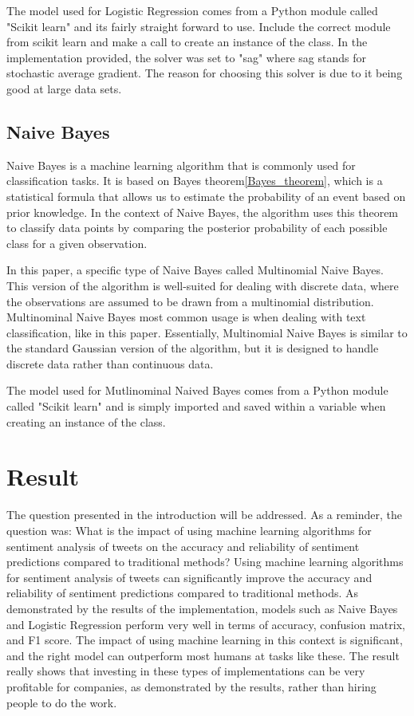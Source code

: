 \documentclass[conference]{IEEEtran}
\begin{document}
The model used for Logistic Regression comes from a Python module called "Scikit learn" and its fairly straight forward to use. Include the correct module from scikit learn and make a call to create an instance of the class. In the implementation provided, the solver was set to "sag"  where sag stands for stochastic average gradient. The reason for choosing this solver is due to it being good at large data sets. \cite{solvers}


\subsection{Naive Bayes}
Naive Bayes is a machine learning algorithm that is commonly used for classification tasks. It is based on Bayes theorem\eqref{Bayes_theorem}, which is a statistical formula that allows us to estimate the probability of an event based on prior knowledge. In the context of Naive Bayes, the algorithm uses this theorem to classify data points by comparing the posterior probability of each possible class for a given observation.

In this paper, a specific type of Naive Bayes called Multinomial Naive Bayes. This version of the algorithm is well-suited for dealing with discrete data, where the observations are assumed to be drawn from a multinomial distribution. Multinominal Naive Bayes most common usage is when dealing with text classification, like in this paper. Essentially, Multinomial Naive Bayes is similar to the standard Gaussian version of the algorithm, but it is designed to handle discrete data rather than continuous data. \cite{albon2018machine} 

The model used for Mutlinominal Naived Bayes comes from a Python module called "Scikit learn" \cite{scikit} and is simply imported and saved within a variable when creating an instance of the class. 



\section{Result}
The question presented in the introduction will be addressed. As a reminder, the question was:
\newline
\newline
What is the impact of using machine learning algorithms for sentiment analysis of tweets on the accuracy and reliability of sentiment predictions compared to traditional methods?
\newline
\newline
Using machine learning algorithms for sentiment analysis of tweets can significantly improve the accuracy and reliability of sentiment predictions compared to traditional methods. As demonstrated by the results of the implementation, models such as Naive Bayes and Logistic Regression perform very well in terms of accuracy, confusion matrix, and F1 score. The impact of using machine learning in this context is significant, and the right model can outperform most humans at tasks like these. The result really shows that investing in these types of implementations can be very profitable for companies, as demonstrated by the results, rather than hiring people to do the work.
\end{document}
